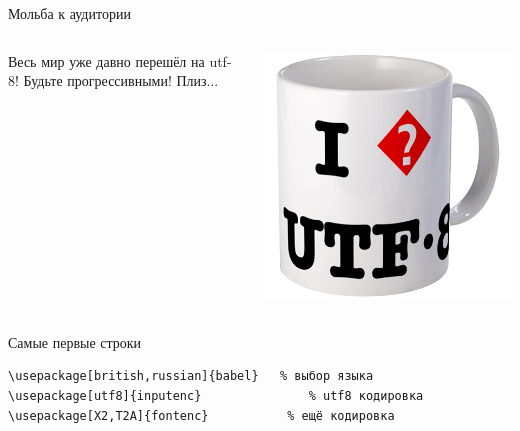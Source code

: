 \documentclass[aspectratio=169]{beamer} %
\begin{document}
\begin{frame}{Мольба к аудитории}
\begin{columns}
\begin{column}{.66\linewidth}
\Large Весь мир уже давно перешёл на utf-8! Будьте прогрессивными! Плиз... 
\end{column}
\begin{column}{.33\linewidth}
\hfill \includegraphics[width=\linewidth]{cuputf8.jpg}	
\end{column}
\end{columns}
\end{frame}


\begin{frame}[fragile]{Самые первые строки}
\begin{block}{  }
\begin{verbatim}
\usepackage[british,russian]{babel}   % выбор языка
\usepackage[utf8]{inputenc}               % utf8 кодировка
\usepackage[X2,T2A]{fontenc}           % ещё кодировка
\end{verbatim}
\end{block}
\end{frame}

\end{document}

